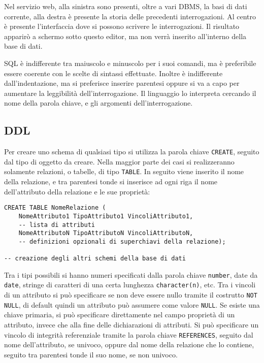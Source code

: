 \documentclass{article}
\numberwithin{equation}{subsection}
\begin{document}
Nel servizio web, alla sinistra sono presenti, oltre a vari DBMS, la basi di dati corrente, alla destra è presente la storia delle precedenti interrogazioni. Al centro è presente l'interfaccia dove si possono 
scrivere le interrogazioni. Il risultato apparirò a schermo sotto questo editor, ma non verrà inserito all'interno della base di dati. 


SQL è indifferente tra maiuscolo e minuscolo per i suoi comandi, ma è preferibile essere coerente con le scelte di sintassi effettuate. Inoltre è indifferente 
dall'indentazione, ma si preferisce inserire parentesi oppure si va a capo per aumentare la leggibilità dell'interrogazione. Il linguaggio lo 
interpreta cercando il nome della parola chiave, e gli argomenti dell'interrogazione.  


\subsection{DDL}

Per creare uno schema di qualsiasi tipo si utilizza la parola chiave \verb|CREATE|, seguito dal tipo di oggetto da creare. Nella maggior parte dei casi si realizzeranno solamente relazioni, o tabelle, di tipo 
\verb|TABLE|. In seguito viene inserito il nome della relazione, e tra parentesi tonde si inserisce ad ogni riga il nome dell'attributo della relazione e le sue proprietà:
\begin{verbatim}
CREATE TABLE NomeRelazione (
    NomeAttributo1 TipoAttributo1 VincoliAttributo1, 
    -- lista di attributi
    NomeAttributoN TipoAttributoN VincoliAttributoN,
    -- definizioni opzionali di superchiavi della relazione);
    
-- creazione degli altri schemi della base di dati
\end{verbatim}

Tra i tipi possibili si hanno numeri specificati dalla parola chiave \verb|number|, date da \verb|date|, stringe di caratteri di una certa lunghezza \verb|character(n)|, etc. Tra i vincoli di un attributo si 
può specificare se non deve essere nullo tramite il costrutto \verb|NOT NULL|, di default quindi un attributo può assumere come valore \verb|NULL|. Se esiste una chiave primaria, si può specificare direttamente nel 
campo proprietà di un attributo, invece che alla fine delle dichiarazioni di attributi. Si può specificare un vincolo di integrità referenziale tramite la parola chiave \verb|REFERENCES|, seguito dal nome dell'attributo, 
se univoco, oppure dal nome della relazione che lo contiene, seguito tra parentesi tonde il suo nome, se non univoco. 
\end{document}
